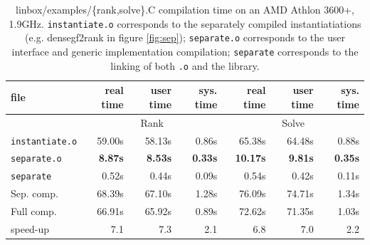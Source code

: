 \documentclass[runningheads,a4paper]{llncs}
\begin{document}
\begin{table}[ht]\center
\begin{tabular}{|l||r|r|r||r|r|r|}
\hline
file                      &  real time   &  user time   &  sys. time  &  real time   &  user time   &  sys. time \\
\hline
 & \multicolumn{3}{|c||}{Rank}& \multicolumn{3}{|c|}{Solve}\\
\hline
 \texttt{instantiate.o}    &   59.00s   &   58.13s   &   0.86s  &   65.38s   &   64.48s   &   0.88s \\
 \texttt{separate.o}      &\bf    8.87s   & \bf    8.53s   & \bf   0.33s  & \bf   10.17s   &  \bf   9.81s   & \bf   0.35s \\
 \texttt{separate}         &    0.52s   &    0.44s   &   0.09s  &    0.54s   &    0.42s   &   0.11s \\
\hline
 Sep. comp.       &   68.39s   &   67.10s   &   1.28s  &   76.09s   &   74.71s   &   1.34s \\
\hline
\hline
 Full comp.       &   66.91s   &   65.92s   &   0.89s  &   72.62s   &   71.35s   &   1.03s \\
\hline
\hline
 speed-up         &   7.1   &   7.3   &   2.1   &   6.8   &   7.0   &   2.2  \\
\hline
\end{tabular} 
\caption{linbox/examples/\{rank,solve\}.C compilation time on an AMD
  Athlon 3600+, 1.9GHz. \texttt{instantiate.o} corresponds to the separately compiled
  instantiatiations (e.g. densegf2rank in figure \ref{fig:sep});
  \texttt{separate.o} corresponds to the user interface and generic
  implementation compilation; \texttt{separate} corresponds to the
  linking of both \texttt{.o} and the library.}\label{tab:compsolve}
\end{table}


 
\end{document}
